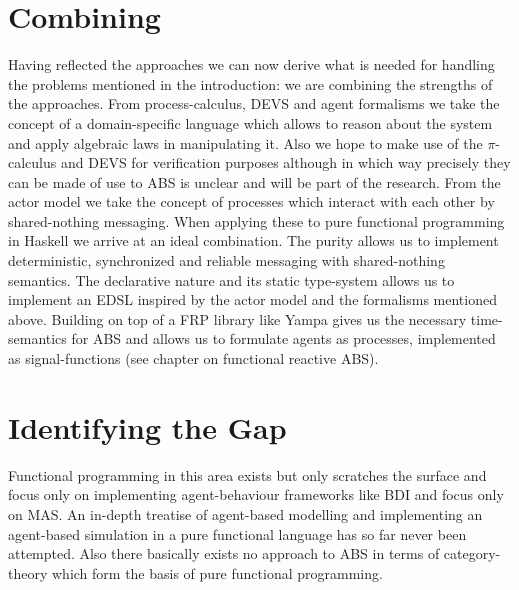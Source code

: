 \section{Combining}
Having reflected the approaches we can now derive what is needed for handling the problems mentioned in the introduction: we are combining the strengths of the approaches. From process-calculus, DEVS and agent formalisms we take the concept of a domain-specific language which allows to reason about the system and apply algebraic laws in manipulating it. Also we hope to make use of the $\pi$-calculus and DEVS for verification purposes although in which way precisely they can be made of use to ABS is unclear and will be part of the research. From the actor model we take the concept of processes which interact with each other by shared-nothing messaging.
When applying these to pure functional programming in Haskell we arrive at an ideal combination. The purity allows us to implement deterministic, synchronized and reliable messaging with shared-nothing semantics. The declarative nature and its static type-system allows us to implement an EDSL inspired by the actor model and the formalisms mentioned above. Building on top of a FRP library like Yampa gives us the necessary time-semantics for ABS and allows us to formulate agents as processes, implemented as signal-functions (see chapter on functional reactive ABS).

\section{Identifying the Gap}
Functional programming in this area exists but only scratches the surface and focus only on implementing agent-behaviour frameworks like BDI and focus only on MAS. An in-depth treatise of agent-based modelling and implementing an agent-based simulation in a pure functional language has so far never been attempted. Also there basically exists no approach to ABS in terms of category-theory which form the basis of pure functional programming.